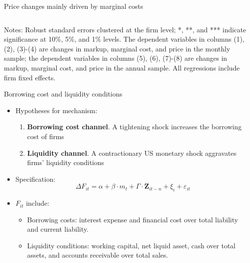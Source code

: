 \documentclass[10pt]{beamer}
\begin{document}
\begin{frame}{Price changes mainly driven by marginal costs}
\begin{table}[htbp]
{\begin{threeparttable}
\begin{tabular}{lcccccccc}
        \bottomrule
    \end{tabular}
        \begin{tablenotes}
            \footnotesize
            \item Notes: Robust standard errors clustered at the firm level;  *, **, and *** indicate significance at 10\%, 5\%, and 1\% levels. The dependent variables in columns (1), (2), (3)-(4) are changes in markup, marginal cost, and price in the monthly sample; the dependent variables in columns (5), (6), (7)-(8) are changes in markup, marginal cost, and price in the annual sample. All regressions include firm fixed effects.
	\end{tablenotes}
    \end{threeparttable}
    }
    \label{tab.markup}

\end{table}
\end{frame}

\begin{frame}{Borrowing cost and liquidity conditions}
    \begin{itemize}
        \item Hypotheses for mechanism:
        \begin{enumerate}
            \item \textbf{Borrowing cost channel}. A tightening shock increases the borrowing cost of firms
            \item \textbf{Liquidity channel}. A contractionary US monetary shock aggravates firms' liquidity conditions
        \end{enumerate}
        \item Specification:
        \begin{equation}
            \Delta F_{it} = \alpha +\beta \cdot m_{t}+ \Gamma \cdot \textbf{Z}_{it-n}+\xi_{i}+\varepsilon_{it} \label{reg.liquid}
        \end{equation}
        \item $F_{it}$ include:
        \begin{itemize}
            \item Borrowing costs: interest expense and financial cost over total liability and current liability.
            \item Liquidity conditions: working capital, net liquid asset, cash over total assets, and accounts receivable over total sales.
        \end{itemize}
    \end{itemize}
\end{frame}
\end{document}
